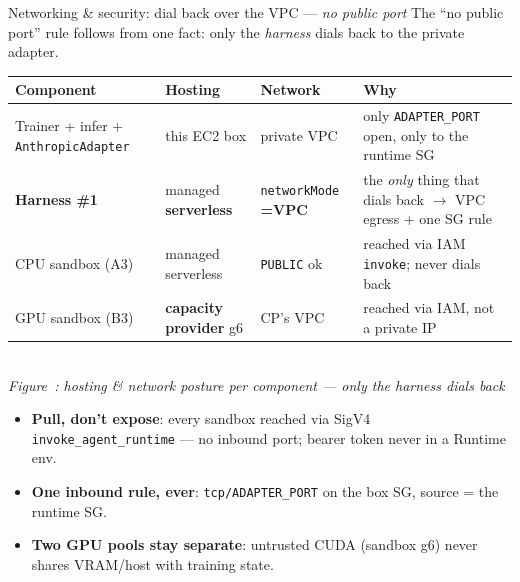 \documentclass[aspectratio=169]{beamer}
\newcounter{deckfig}
\newcommand{\figtag}[1]{\refstepcounter{deckfig}%
  {\scriptsize\itshape Figure~\thedeckfig: #1}}
\begin{document}
\begin{frame}{Networking \& security: dial back over the VPC --- \emph{no public port}}
  \footnotesize The ``no public port'' rule follows from one fact: only the \emph{harness} dials back to
  the private adapter.
  \begin{center}\scriptsize
  \begin{tabular}{@{}p{2.9cm}p{2.4cm}p{2.0cm}p{4.0cm}@{}}
    \toprule
    \textbf{Component} & \textbf{Hosting} & \textbf{Network} & \textbf{Why} \\
    \midrule
    Trainer + infer + \texttt{AnthropicAdapter} & this EC2 box & private VPC &
      only \texttt{ADAPTER\_PORT} open, only to the runtime SG \\
    \textbf{Harness \#1} & managed \textbf{serverless} & \texttt{networkMode} \textbf{=VPC} &
      the \emph{only} thing that dials back $\to$ VPC egress + one SG rule \\
    CPU sandbox (A3) & managed serverless & \texttt{PUBLIC} ok &
      reached via IAM \texttt{invoke}; never dials back \\
    GPU sandbox (B3) & \textbf{capacity provider} g6 & CP's VPC & reached via IAM, not a private IP \\
    \bottomrule
  \end{tabular}
  \\[0.1em]\figtag{hosting \& network posture per component --- only the harness dials back}
  \end{center}
  \vspace{0.2em}
  \begin{itemize}\setlength\itemsep{0.1em}
    \item \textbf{Pull, don't expose}: every sandbox reached via SigV4 \texttt{invoke\_agent\_runtime} ---
      no inbound port; bearer token never in a Runtime env.
    \item \textbf{One inbound rule, ever}: \texttt{tcp/ADAPTER\_PORT} on the box SG, source = the runtime SG.
    \item \textbf{Two GPU pools stay separate}: untrusted CUDA (sandbox g6) never shares VRAM/host with training state.
  \end{itemize}
\end{frame}
\end{document}
